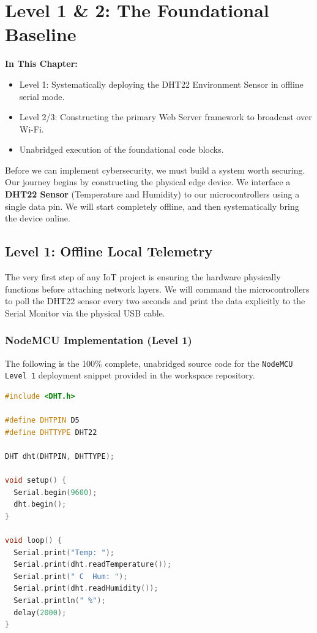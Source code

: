 \chapter{Level 1 \& 2: The Foundational Baseline}

\textbf{In This Chapter:}
\begin{itemize}
    \item Level 1: Systematically deploying the DHT22 Environment Sensor in offline serial mode.
    \item Level 2/3: Constructing the primary Web Server framework to broadcast over Wi-Fi.
    \item Unabridged execution of the foundational code blocks.
\end{itemize}

Before we can implement cybersecurity, we must build a system worth securing. Our journey begins by constructing the physical edge device. We interface a \textbf{DHT22 Sensor} (Temperature and Humidity) to our microcontrollers using a single data pin. We will start completely offline, and then systematically bring the device online.

\section{Level 1: Offline Local Telemetry}
The very first step of any IoT project is ensuring the hardware physically functions before attaching network layers. We will command the microcontrollers to poll the DHT22 sensor every two seconds and print the data explicitly to the Serial Monitor via the physical USB cable. 

\subsection{NodeMCU Implementation (Level 1)}
The following is the 100\% complete, unabridged source code for the \texttt{NodeMCU Level 1} deployment snippet provided in the workspace repository.

\begin{lstlisting}[language=C++, caption=23022026\_Level\_1\_dht\_22\_Only\_Read\_Level\_1.ino]
#include <DHT.h>

#define DHTPIN D5
#define DHTTYPE DHT22

DHT dht(DHTPIN, DHTTYPE);

void setup() {
  Serial.begin(9600);
  dht.begin();
}

void loop() {
  Serial.print("Temp: ");
  Serial.print(dht.readTemperature());
  Serial.print(" C  Hum: ");
  Serial.print(dht.readHumidity());
  Serial.println(" %");
  delay(2000);
}
\end{lstlisting}

